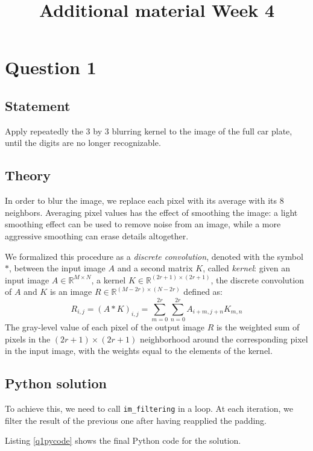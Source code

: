 \documentclass{article}
\title{Additional material Week 4}
\date{\vspace{-5ex}}
\newcommand{\py}[1]{\texttt{\lstinline!#1!}}
\begin{document}
\maketitle

\section{Question 1}
\subsection{Statement}
Apply repeatedly the 3 by 3 blurring kernel to the image of the full car plate, until the digits are no longer recognizable.

\subsection{Theory}
In order to blur the image, we replace each pixel with its average with its 8 neighbors. Averaging pixel values has the effect of smoothing the image: a light smoothing effect can be used to remove noise from an image, while a more aggressive smoothing can erase details altogether.

We formalized this procedure as a \emph{discrete convolution}, denoted with the symbol $*$, between the input image $A$ and a second matrix $K$, called \emph{kernel}: given an input image $A \in \mathbb{R}^{M \times N}$,  a kernel $K \in \mathbb{R}^{(2r +1)\times (2r+1)}$, the discrete convolution of $A$ and $K$ is an image $R \in \mathbb{R}^{(M - 2r)\times (N-2r)}$ defined as:
\begin{equation*}
    R_{i, j} = (A * K)_{i,j} = \sum_{m=0}^{2r}\sum_{n=0}^{2r} A_{i+m,j+n}K_{m,n}
\end{equation*}
The gray-level value of each pixel of the output image $R$ is the weighted sum of pixels in the $(2r+1)\times(2r+1)$ neighborhood around the corresponding pixel in the input image, with the weights equal to the elements of the kernel.

\subsection{Python solution}
To achieve this, we need to call \py{im_filtering} in a loop. At each iteration, we filter the result of the previous one after having reapplied the padding.

Listing \ref{q1pycode} shows the final Python code for the solution.

\end{document}
